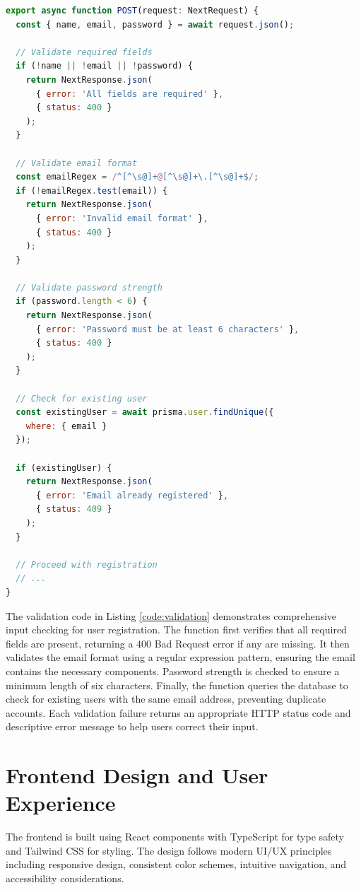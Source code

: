 \begin{lstlisting}[language=JavaScript, caption=Server-Side Input Validation, label=code:validation]
export async function POST(request: NextRequest) {
  const { name, email, password } = await request.json();
  
  // Validate required fields
  if (!name || !email || !password) {
    return NextResponse.json(
      { error: 'All fields are required' },
      { status: 400 }
    );
  }
  
  // Validate email format
  const emailRegex = /^[^\s@]+@[^\s@]+\.[^\s@]+$/;
  if (!emailRegex.test(email)) {
    return NextResponse.json(
      { error: 'Invalid email format' },
      { status: 400 }
    );
  }
  
  // Validate password strength
  if (password.length < 6) {
    return NextResponse.json(
      { error: 'Password must be at least 6 characters' },
      { status: 400 }
    );
  }
  
  // Check for existing user
  const existingUser = await prisma.user.findUnique({
    where: { email }
  });
  
  if (existingUser) {
    return NextResponse.json(
      { error: 'Email already registered' },
      { status: 409 }
    );
  }
  
  // Proceed with registration
  // ...
}
\end{lstlisting}

The validation code in Listing \ref{code:validation} demonstrates comprehensive input checking for user registration. The function first verifies that all required fields are present, returning a 400 Bad Request error if any are missing. It then validates the email format using a regular expression pattern, ensuring the email contains the necessary components. Password strength is checked to ensure a minimum length of six characters. Finally, the function queries the database to check for existing users with the same email address, preventing duplicate accounts. Each validation failure returns an appropriate HTTP status code and descriptive error message to help users correct their input.

\section{Frontend Design and User Experience}

The frontend is built using React components with TypeScript for type safety and Tailwind CSS for styling. The design follows modern UI/UX principles including responsive design, consistent color schemes, intuitive navigation, and accessibility considerations.

